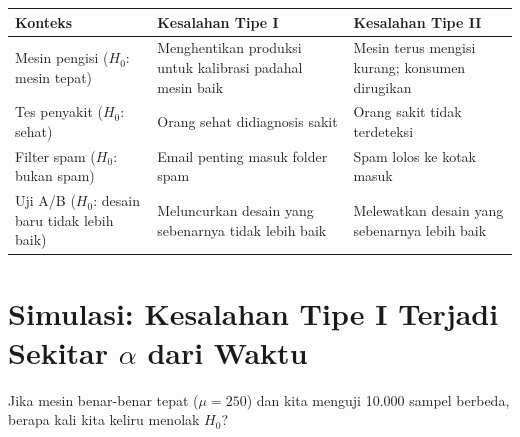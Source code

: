 \documentclass[
  indonesian,
  letterpaper,
]{book}
\newcounter{none} %
\begin{document}
{\def\LTcaptype{none} %
\begin{longtable}[]{@{}
  >{\raggedright\arraybackslash}p{}
  >{\raggedright\arraybackslash}p{}
  >{\raggedright\arraybackslash}p{}@{}}
\toprule\noalign{}
\begin{minipage}[b]{\linewidth}\raggedright
Konteks
\end{minipage} & \begin{minipage}[b]{\linewidth}\raggedright
Kesalahan Tipe I
\end{minipage} & \begin{minipage}[b]{\linewidth}\raggedright
Kesalahan Tipe II
\end{minipage} \\
\midrule\noalign{}
\endhead
\bottomrule\noalign{}
\endlastfoot
Mesin pengisi (\(H_0\): mesin tepat) & Menghentikan produksi untuk
kalibrasi padahal mesin baik & Mesin terus mengisi kurang; konsumen
dirugikan \\
Tes penyakit (\(H_0\): sehat) & Orang sehat didiagnosis sakit & Orang
sakit tidak terdeteksi \\
Filter spam (\(H_0\): bukan spam) & Email penting masuk folder spam &
Spam lolos ke kotak masuk \\
Uji A/B (\(H_0\): desain baru tidak lebih baik) & Meluncurkan desain
yang sebenarnya tidak lebih baik & Melewatkan desain yang sebenarnya
lebih baik \\
\end{longtable}
}

\section{\texorpdfstring{Simulasi: Kesalahan Tipe I Terjadi Sekitar
\(\alpha\) dari
Waktu}{Simulasi: Kesalahan Tipe I Terjadi Sekitar \textbackslash alpha dari Waktu}}\label{simulasi-kesalahan-tipe-i-terjadi-sekitar-alpha-dari-waktu}

Jika mesin benar-benar tepat (\(\mu = 250\)) dan kita menguji 10.000
sampel berbeda, berapa kali kita keliru menolak \(H_0\)?
\end{document}
